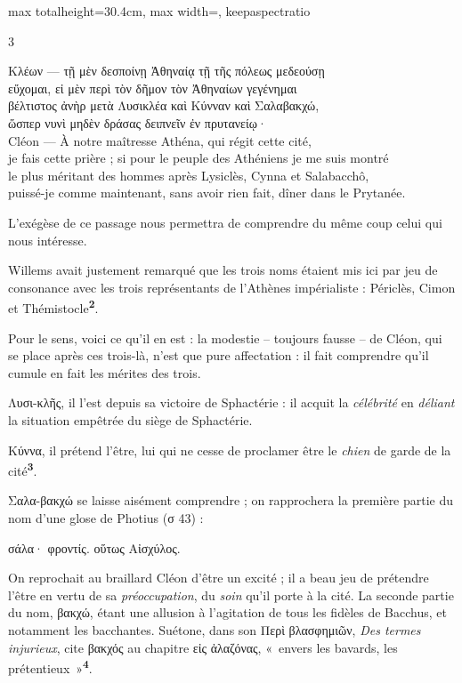 \documentclass[11pt,twoside]{book}
\newcommand{\italique}[1]{\textit{#1}}
\newcommand{\citComm}[1]{\begin{quoting}[vskip=0.4pt,leftmargin=0.7em,rightmargin=0.2em]#1\end{quoting}}
\newcommand{\francais}[1]{{\policeFr #1}}
\newcommand{\marqueur}[1]{\textsuperscript{\color{rubricRed}\textbf{#1}}}
\begin{document}
\begin{adjustbox}{max totalheight=30.4cm, max width=\textwidth, keepaspectratio}
\begin{minipage}{\textwidth}
{\begin{multicols}{3}
\citComm{Κλέων --- τῇ μὲν δεσποίνῃ Ἀθηναίᾳ τῇ τῆς πόλεως μεδεούσῃ\\
εὔχομαι, εἰ μὲν περὶ τὸν δῆμον τὸν Ἀθηναίων γεγένημαι\\
βέλτιστος ἀνὴρ μετὰ Λυσικλέα καὶ Κύνναν καὶ Σαλαβακχώ,\\
ὥσπερ νυνὶ μηδὲν δράσας δειπνεῖν ἐν πρυτανείῳ·\\
Cléon --- \francais{À notre maîtresse Athéna, qui régit cette cité,\\
je fais cette prière ; si pour le peuple des Athéniens je me suis montré\\
le plus méritant des hommes après Lysiclès, Cynna et Salabacchô,\\
puissé-je comme maintenant, sans avoir rien fait, dîner dans le Prytanée.}}
\par\vspace{1.5pt}
\noindent L'exégèse de ce passage nous permettra de comprendre du même coup celui qui nous intéresse.
\par\vspace{1.5pt}
\noindent Willems avait justement remarqué que les trois noms étaient mis ici par jeu de consonance avec les trois représentants de l'Athènes impérialiste : Périclès, Cimon et Thémistocle\marqueur{2}.
\par\vspace{1.5pt}
\noindent Pour le sens, voici ce qu'il en est : la modestie -- toujours fausse -- de Cléon, qui se place après ces trois-là, n'est que pure affectation : il fait comprendre qu'il cumule en fait les mérites des trois.
\par\vspace{1.5pt}
\noindent Λυσι-κλῆς, il l'est depuis sa victoire de Sphactérie : il acquit la \italique{célébrité} en \italique{déliant} la situation empêtrée du siège de Sphactérie.
\par\vspace{1.5pt}
\noindent Κύννα, il prétend l'être, lui qui ne cesse de proclamer être le \italique{chien} de garde de la cité\marqueur{3}.
\par\vspace{1.5pt}
\noindent Σαλα-βακχώ se laisse aisément comprendre ; on rapprochera la première partie du nom d'une glose de Photius (σ 43) :
\citComm{σάλα· φροντίς. οὕτως Αἰσχύλος.}
\par\vspace{1.5pt}
\noindent On reprochait au braillard Cléon d'être un excité ; il a beau jeu de prétendre l'être en vertu de sa \italique{préoccupation}, du \italique{soin} qu'il porte à la cité. La seconde partie du nom, βακχώ, étant une allusion à l'agitation de tous les fidèles de Bacchus, et notamment les bacchantes. Suétone, dans son Περὶ βλασφημιῶν, \italique{Des termes injurieux}, cite βακχός au chapitre εἰς ἀλαζόνας, «~envers les bavards, les prétentieux~»\marqueur{4}.

\end{multicols}}
\end{minipage}
\end{adjustbox}
\end{document}
